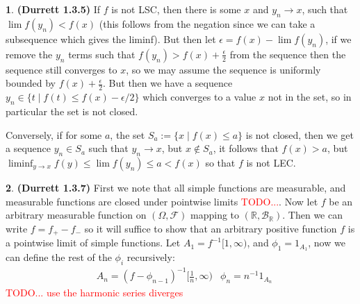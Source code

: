 \documentclass[10.5pt]{article}
\theoremstyle{definition}
\newtheorem{pb}{}
\newcommand{\set}[1]{\{#1\}}
\begin{document}
    \begin{pb}\textbf{(Durrett 1.3.5)}
        If \(f\) is not LSC, then there is some \(x\) and \(y_n \to x\), such that \(\lim f(y_n) < f(x)\) (this follows from the negation since we can take a subsequence which gives the liminf). But then let \(\epsilon = f(x) - \lim f(y_n)\), if we remove the \(y_n\) terms such that \(f(y_n) > f(x) + \frac{\epsilon}{2}\) from the sequence then the sequence still converges to \(x\), so we may assume the sequence is uniformly bounded by \(f(x) + \frac{\epsilon}{2}\). But then we have a sequence \(y_n \in \set{t \mid f(t) \leq f(x) - \epsilon/2}\) which converges to a value \(x\) not in the set, so in particular the set is not closed.

        Conversely, if for some \(a\), the set \(S_a := \set{x \mid f(x) \leq a}\) is not closed, then we get a sequence \(y_n \in S_a\) such that \(y_n \to x\), but \(x \not \in S_a\), it follows that \(f(x) > a\), but \(\liminf_{y\to x}f(y) \leq \lim f(y_n) \leq a < f(x)\) so that \(f\) is not LEC.
    \end{pb}
    \begin{pb} \textbf{(Durrett 1.3.7)}
        First we note that all simple functions are measurable, and measurable functions are closed under pointwise limits \textcolor{red}{TODO...}. Now let \(f\) be an arbitrary measurable function on \((\Omega,\mathcal{F})\) mapping to \((\mathbb{R},\mathcal{B}_\mathbb{R})\). Then we can write \(f = f_+ - f_-\) so it will suffice to show that an arbitrary positive function \(f\) is a pointwise limit of simple functions. Let \(A_1 = f^{-1}[1,\infty)\), and \(\phi_1 = 1_{A_1}\), now we can define the rest of the \(\phi_i\) recursively:
        \begin{align*}
            &A_n = (f - \phi_{n-1})^{-1}[\frac{1}{n},\infty) &\phi_n = n^{-1}1_{A_n}
        \end{align*} 
        \textcolor{red}{TODO... use the harmonic series diverges}
    \end{pb}
\end{document}
